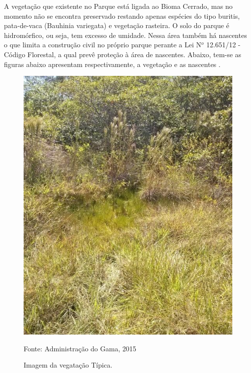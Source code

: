 A vegeta\c{c}\~ao que existente no Parque est\'a ligada ao Bioma Cerrado, mas no momento n\~ao se encontra preservado restando apenas esp\'ecies do tipo buritis, pata-de-vaca (Bauhinia variegata) e vegeta\c{c}\~ao rasteira.  O solo do parque \'e hidrom\'orfico, ou seja, tem excesso de umidade. Nessa \'area tamb\'em h\'a nascentes o que limita a constru\c{c}\~ao civil no pr\'oprio parque perante a Lei N$^{o}$ 12.651/12 - C\'odigo Florestal, a qual prev\^e prote\c{c}\~ao \`a \'area de nascentes. Abaixo, tem-se as figuras abaixo apresentam respectivamente, a vegeta\c{c}\~ao e as nascentes \cite{COEX}.

\begin{figure}[h]
	\centering
	\label{Imagem do Parque Vivencial do Gama}
		\includegraphics[keepaspectratio=true,scale=0.4]{figuras/VegatacaoTipica.jpg}
	\caption{Imagem da vegata\c{c}\~ao T\'ipica.}
	\small{Fonte: Administra\c{c}\~ao do Gama, 2015}
\end{figure}

